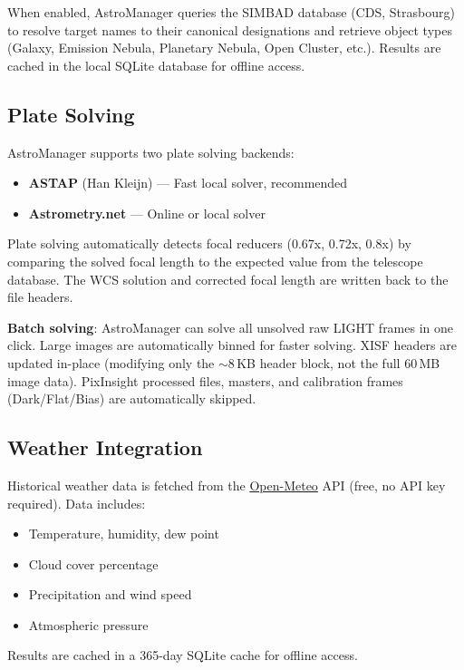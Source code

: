 \documentclass[11pt,a4paper]{article}
\begin{document}
When enabled, AstroManager queries the SIMBAD database (CDS, Strasbourg) to resolve target names to their canonical designations and retrieve object types (Galaxy, Emission Nebula, Planetary Nebula, Open Cluster, etc.). Results are cached in the local SQLite database for offline access.

\subsection{Plate Solving}

AstroManager supports two plate solving backends:

\begin{itemize}
    \item \textbf{ASTAP} (Han Kleijn) --- Fast local solver, recommended
    \item \textbf{Astrometry.net} --- Online or local solver
\end{itemize}

Plate solving automatically detects focal reducers (0.67x, 0.72x, 0.8x) by comparing the solved focal length to the expected value from the telescope database. The WCS solution and corrected focal length are written back to the file headers.

\textbf{Batch solving}: AstroManager can solve all unsolved raw LIGHT frames in one click. Large images are automatically binned for faster solving. XISF headers are updated in-place (modifying only the $\sim$8\,KB header block, not the full 60\,MB image data). PixInsight processed files, masters, and calibration frames (Dark/Flat/Bias) are automatically skipped.

\subsection{Weather Integration}

Historical weather data is fetched from the \href{https://open-meteo.com/}{Open-Meteo} API (free, no API key required). Data includes:

\begin{itemize}
    \item Temperature, humidity, dew point
    \item Cloud cover percentage
    \item Precipitation and wind speed
    \item Atmospheric pressure
\end{itemize}

Results are cached in a 365-day SQLite cache for offline access.
\end{document}
